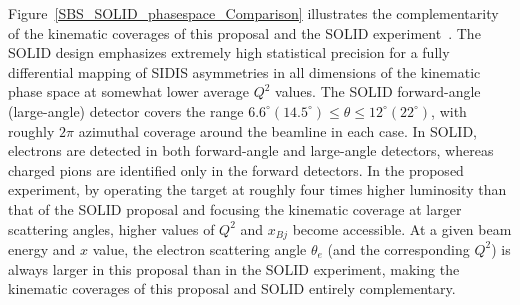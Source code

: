 Figure~\ref{SBS_SOLID_phasespace_Comparison} illustrates the complementarity of the kinematic coverages of this proposal and the SOLID experiment~\cite{SOLID_He3_longitudinal}. The SOLID design emphasizes extremely high statistical precision for a fully differential mapping of SIDIS asymmetries in all dimensions of the kinematic phase space at somewhat lower average $Q^2$ values. The SOLID forward-angle (large-angle) detector covers the range $6.6^\circ (14.5^\circ) \le \theta \le 12^\circ (22^\circ)$, with roughly $2\pi$ azimuthal coverage around the beamline in each case. In SOLID, electrons are detected in both forward-angle and large-angle detectors, whereas charged pions are identified only in the forward detectors. In the proposed experiment, by operating the target at roughly four times higher luminosity than that of the SOLID proposal and focusing the kinematic coverage at larger scattering angles, higher values of $Q^2$ and $x_{Bj}$ become accessible. At a given beam energy and $x$ value, the electron scattering angle $\theta_e$ (and the corresponding $Q^2$) is always larger in this proposal than in the SOLID experiment, making the kinematic coverages of this proposal and SOLID entirely complementary. 

